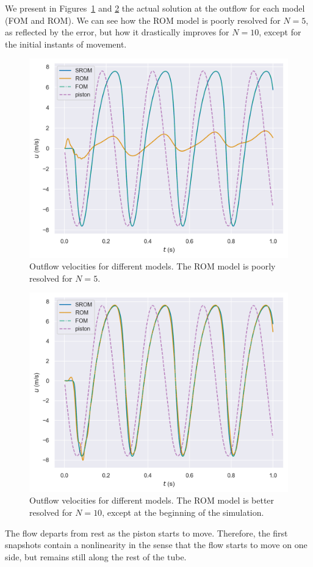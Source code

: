 \documentclass[../../thesis.tex]{subfiles}
\begin{document}
We present in Figures~\ref{fig:outflow_model_comparison_N_5} and \ref{fig:outflow_model_comparison_N_10} 
the actual solution at the outflow for each model (FOM and ROM).
We can see how the ROM model is poorly resolved for $N=5$, as reflected by the error,
but how it drastically improves for $N=10$, except for the initial instants of movement.
\begin{figure}[h]
    \centering
    \includegraphics[width=\columnwidth]{research_project/piston/figures/rb_certification/outflow_probes_comparison_rom_5_srom_15_online_0.png}
    \caption{Outflow velocities for different models. The ROM model is poorly resolved for $N=5$.}
    \label{fig:outflow_model_comparison_N_5}
\end{figure}
\begin{figure}[h]
    \centering
    \includegraphics[width=\columnwidth]{research_project/piston/figures/rb_certification/outflow_probes_comparison_rom_10_srom_20_online_0.png}
    \caption{Outflow velocities for different models. 
    The ROM model is better resolved for $N=10$, except at the beginning of the simulation.}
    \label{fig:outflow_model_comparison_N_10}
\end{figure}
The flow departs from rest as the piston starts to move.
Therefore, the first snapshots contain a nonlinearity in the sense that the flow starts to move on one side, 
but remains still along the rest of the tube.
\end{document}
